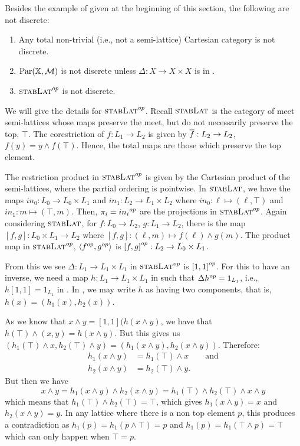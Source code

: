 \begin{example}\label{ex:various_not_discrete}
Besides the example of \topcatp given at the beginning of this section, the following are not discrete:
  \begin{enumerate}[{(}i{)}]
  \item Any total non-trivial (i.e., not a semi-lattice) Cartesian category is not discrete.
  \item $\text{Par}(\mathbb{X},\mathcal{M})$ is not discrete unless $\Delta: X\to X\times X$ is in \Mstab.
  \item ${\textsc{stabLat}}^{op}$ is not discrete.
  \end{enumerate}
  We will give the details for ${\textsc{stabLat}}^{op}$. Recall $\textsc{stabLat}$ is the category of meet
  semi-lattices whose maps preserve the meet, but do not necessarily preserve the top, $\top$. The
  corestriction of $f:L_1\to L_2$ is given by $\overline{f}:L_2\to L_2$, $f(y) = y\wedge f(\top)$. Hence,
  the total maps are those which preserve the top element.

  The restriction product in ${\textsc{stabLat}}^{op}$ is given by the Cartesian product of the
  semi-lattices, where the partial ordering is pointwise. In $\textsc{stabLat}$, we have the maps $in_0: L_0
  \to L_0\times L_1$ and $in_1:L_2 \to L_1\times L_2$ where $in_0: \ell\mapsto (\ell,\top)$ and
  $in_1: m \mapsto (\top,m)$. Then, $\pi_i = {in_i}^{op}$ are the projections in ${\textsc{stabLat}}^{op}$. Again considering
  $\textsc{stabLat}$, for $f:L_0 \to L_2$, $g:L_1 \to L_2$, there is the map $[f,g]:L_0\times L_1 \to L_2$
  where $[f,g]:(\ell,m)\mapsto f(\ell)\wedge g(m)$. The product map in ${\textsc{stabLat}}^{op}$,
  $\langle{f}^{op},{g}^{op}\rangle$ is ${[f,g]}^{op}:L_2 \to L_0\times L_1$.

  From this we see $\Delta:L_1\to L_1\times L_1$ in ${\textsc{stabLat}}^{op}$ is ${[1,1]}^{op}$. For this to
  have an inverse, we  need a map $h:L_1\to L_1\times L_1$ in \stabLat such that
  $\Delta {h}^{op} = 1_{L_1}$, i.e.,  $h[1,1] = 1_{L_1}$ in \stabLat. In \stabLat, we may write $h$
  as having two components, that is, $h(x) = (h_1(x),h_2(x))$.

  As we know that $x\wedge y = [1,1](h(x\wedge y)$, we have that $h(\top) \wedge (x,y) = h (x\wedge
  y)$. But this gives us $(h_1(\top) \wedge x, h_2(\top) \wedge y) = (h_1(x\wedge y), h_2(x\wedge
  y))$.
  Therefore:
  \begin{align*}
    h_1(x\wedge y) &= h_1(\top)\wedge x\qquad\text{and}\\
    h_2(x\wedge y) &= h_2(\top)\wedge y.
  \end{align*}
  But then we have
  \[
     x\wedge y = h_1(x\wedge y) \wedge h_2(x\wedge y)  = h_1(\top)\wedge h_2(\top)\wedge x\wedge y
  \]
  which means that $h_1(\top)\wedge h_2(\top) = \top$, which gives $h_1(x\wedge y) = x$ and
  $h_2(x\wedge y) = y$. In any lattice where there is a non top element $p$, this produces a
  contradiction as $h_1(p) = h_1(p\wedge \top) = p$ and $h_1(p) = h_1(\top\wedge p) = \top$ which
  can only happen when $\top = p$.


\end{example}
